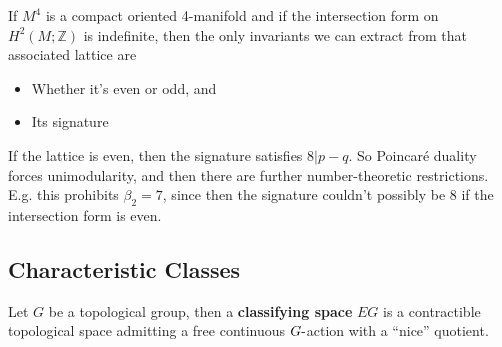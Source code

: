 \begin{remark}

If \(M^4\) is a compact oriented 4-manifold and if the intersection form
on \(H^2(M; {\mathbb{Z}})\) is indefinite, then the only invariants we
can extract from that associated lattice are

\begin{itemize}
\tightlist
\item
  Whether it's even or odd, and
\item
  Its signature
\end{itemize}

If the lattice is even, then the signature satisfies
\(8\mathrel{\Big|}p-q\). So Poincaré duality forces unimodularity, and
then there are further number-theoretic restrictions. E.g. this
prohibits \(\beta_2 =7\), since then the signature couldn't possibly be
8 if the intersection form is even.

\end{remark}

\hypertarget{characteristic-classes}{%
\subsection{Characteristic Classes}\label{characteristic-classes}}

\begin{definition}[?]

Let \(G\) be a topological group, then a \textbf{classifying space}
\(EG\) is a contractible topological space admitting a free continuous
\(G{\hbox{-}}\)action with a ``nice'' quotient.

\end{definition}


